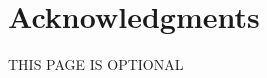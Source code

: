 \documentclass[./dissertation.tex]{subfiles}
\begin{document}
  \chapter*{Acknowledgments}


  \lipsum[7]

  
  THIS PAGE IS OPTIONAL
\end{document}
